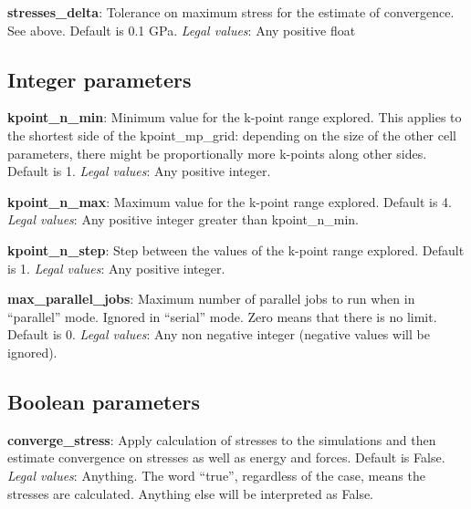 \documentclass[10pt]{article}
\begin{document}
\textbf{stresses\_delta}: Tolerance on maximum stress for the estimate of convergence. See above. Default is 0.1 GPa.\newline
\textit{Legal values}: Any positive float\newline

\subsection{Integer parameters}

\textbf{kpoint\_n\_min}: Minimum value for the k-point range explored. This applies to the shortest side of the kpoint\_mp\_grid: depending on the size of the other cell parameters, there might be proportionally more k-points along other sides. Default is 1.\newline
\textit{Legal values}: Any positive integer.\newline

\textbf{kpoint\_n\_max}: Maximum value for the k-point range explored. Default is 4.\newline
\textit{Legal values}: Any positive integer greater than kpoint\_n\_min.\newline

\textbf{kpoint\_n\_step}: Step between the values of the k-point range explored. Default is 1.\newline
\textit{Legal values}: Any positive integer.\newline

\textbf{max\_parallel\_jobs}: Maximum number of parallel jobs to run when in ``parallel'' mode. Ignored in ``serial'' mode. Zero means that there is no limit. Default is 0.\newline
\textit{Legal values}: Any non negative integer (negative values will be ignored).\newline

\subsection{Boolean parameters}

\textbf{converge\_stress}: Apply calculation of stresses to the simulations and then estimate convergence on stresses as well as energy and forces. Default is False.\newline
\textit{Legal values}: Anything. The word ``true'', regardless of the case, means the stresses are calculated. Anything else will be interpreted as False.\newline
\end{document}
